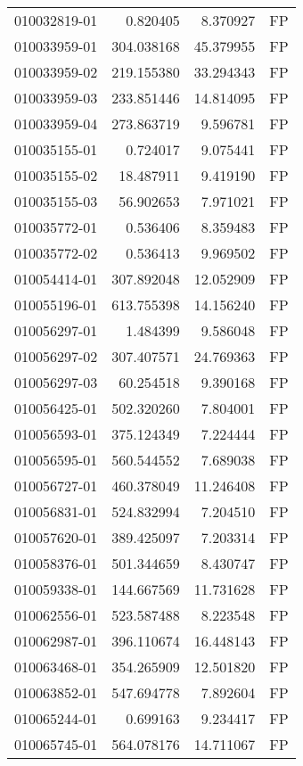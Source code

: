 \begin{tabular}{lrrl}
010032819-01 &    0.820405 &     8.370927 &   FP \\
010033959-01 &  304.038168 &    45.379955 &   FP \\
010033959-02 &  219.155380 &    33.294343 &   FP \\
010033959-03 &  233.851446 &    14.814095 &   FP \\
010033959-04 &  273.863719 &     9.596781 &   FP \\
010035155-01 &    0.724017 &     9.075441 &   FP \\
010035155-02 &   18.487911 &     9.419190 &   FP \\
010035155-03 &   56.902653 &     7.971021 &   FP \\
010035772-01 &    0.536406 &     8.359483 &   FP \\
010035772-02 &    0.536413 &     9.969502 &   FP \\
010054414-01 &  307.892048 &    12.052909 &   FP \\
010055196-01 &  613.755398 &    14.156240 &   FP \\
010056297-01 &    1.484399 &     9.586048 &   FP \\
010056297-02 &  307.407571 &    24.769363 &   FP \\
010056297-03 &   60.254518 &     9.390168 &   FP \\
010056425-01 &  502.320260 &     7.804001 &   FP \\
010056593-01 &  375.124349 &     7.224444 &   FP \\
010056595-01 &  560.544552 &     7.689038 &   FP \\
010056727-01 &  460.378049 &    11.246408 &   FP \\
010056831-01 &  524.832994 &     7.204510 &   FP \\
010057620-01 &  389.425097 &     7.203314 &   FP \\
010058376-01 &  501.344659 &     8.430747 &   FP \\
010059338-01 &  144.667569 &    11.731628 &   FP \\
010062556-01 &  523.587488 &     8.223548 &   FP \\
010062987-01 &  396.110674 &    16.448143 &   FP \\
010063468-01 &  354.265909 &    12.501820 &   FP \\
010063852-01 &  547.694778 &     7.892604 &   FP \\
010065244-01 &    0.699163 &     9.234417 &   FP \\
010065745-01 &  564.078176 &    14.711067 &   FP \\

\end{tabular}
